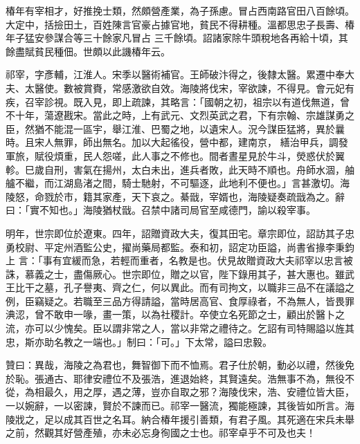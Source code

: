 \begin{pinyinscope}
 椿年有宰相才，好推挽士類，然頗營產業，為子孫慮。冒占西南路官田八百餘頃。大定中，括撿田土，百姓陳言官豪占據官地，貧民不得耕種。溫都思忠子長壽、椿年子猛安參謀合等三十餘家凡冒占
 三千餘頃。詔諸家除牛頭稅地各再給十頃，其餘盡賦貧民種佃。世頗以此譏椿年云。



 祁宰，字彥輔，江淮人。宋季以醫術補官。王師破汴得之，後隸太醫。累遷中奉大夫、太醫使。數被賞賚，常感激欲自效。海陵將伐宋，宰欲諫，不得見。會元妃有疾，召宰診視。既入見，即上疏諫，其略言：「國朝之初，祖宗以有道伐無道，曾不十年，蕩遼戡宋。當此之時，上有武元、文烈英武之君，下有宗翰、宗雄謀勇之臣，然猶不能混一區宇，舉江淮、巴蜀之地，以遺宋人。況今謀臣猛將，異於曩時。且宋人無罪，師出無名。加以大起徭役，營中都，建南京，
 繕治甲兵，調發軍旅，賦役煩重，民人怨嗟，此人事之不修也。間者晝星見於牛斗，熒惑伏於翼軫。巳歲自刑，害氣在揚州，太白未出，進兵者敗，此天時不順也。舟師水涸，舳艫不繼，而江湖島渚之間，騎士馳射，不可驅逐，此地利不便也。」言甚激切。海陵怒，命戮於市，籍其家產，天下哀之。綦戩，宰婿也，海陵疑奏疏戩為之。辭曰：「實不知也。」海陵猶杖戩。召禁中諸司局官至咸德門，諭以殺宰事。



 明年，世宗即位於遼東。四年，詔贈資政大夫，復其田宅。章宗即位，詔訪其子忠勇校尉、平定州酒監公史，擢尚藥局都監。泰和初，詔定功臣謚，尚書省掾李秉鈞上
 言：「事有宜緩而急，若輕而重者，名教是也。伏見故贈資政大夫祁宰以忠言被誅，慕義之士，盡傷厥心。世宗即位，贈之以官，陛下錄用其子，甚大惠也。雖武王比干之墓，孔子譽夷、齊之仁，何以異此。而有司拘文，以職非三品不在議謚之例，臣竊疑之。若職至三品方得請謚，當時居高官、食厚祿者，不為無人，皆畏罪淟涊，曾不敢申一喙，畫一策，以為社稷計。卒使立名死節之士，顧出於醫卜之流，亦可以少愧矣。臣以謂非常之人，當以非常之禮待之。乞詔有司特賜謚以旌其忠，斯亦助名教之一端也。」制曰：「可。」下太常，謚曰忠毅。



 贊曰：異哉，海陵之為君也，舞智御下而不恤焉。君子仕於朝，動必以禮，然後免於恥。張通古、耶律安禮位不及張浩，進退始終，其賢遠矣。浩無事不為，無役不從，為相最久，用之厚，遇之薄，豈亦自取之邪？海陵伐宋，浩、安禮位皆大臣，一以婉辭，一以密諫，賢於不諫而已。祁宰一醫流，獨能極諫，其後皆如所言。海陵戕之，足以成其百世之名耳。納合椿年援引善類，有君子風。其死適在宋兵未舉之前，然觀其好營產殖，亦未必忘身徇國之士也。祁宰卓乎不可及也夫！



\end{pinyinscope}